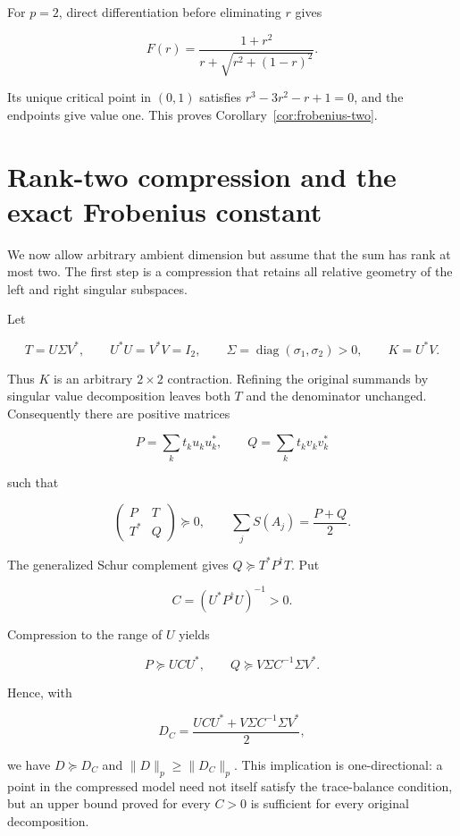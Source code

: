 \documentclass[11pt]{article}
\begin{document}
For $p=2$, direct differentiation before eliminating $r$ gives

\[
F(r)=\frac{1+r^2}{r+\sqrt{r^2+(1-r)^2}}.
\]

Its unique critical point in $(0,1)$ satisfies
$r^3-3r^2-r+1=0$, and the endpoints give value one. This proves Corollary~\ref{cor:frobenius-two}.

\section{Rank-two compression and the exact Frobenius constant}


We now allow arbitrary ambient dimension but assume that the sum has rank at most
two. The first step is a compression that retains all relative geometry of the
left and right singular subspaces.

Let

\[
T=U\Sigma V^*,\qquad U^*U=V^*V=I_2,\qquad
\Sigma=\operatorname{diag}(\sigma_1,\sigma_2)>0,
\qquad K=U^*V.
\tag{6.1}\label{eq:6.1}
\]

Thus $K$ is an arbitrary $2\times2$ contraction. Refining the original summands
by singular value decomposition leaves both $T$ and the denominator unchanged.
Consequently there are positive matrices

\[
P=\sum_k t_ku_ku_k^*,\qquad
Q=\sum_k t_kv_kv_k^*
\tag{6.2}\label{eq:6.2}
\]

such that

\[
\begin{pmatrix}P&T\\T^*&Q\end{pmatrix}\succeq0,\qquad
\sum_jS(A_j)=\frac{P+Q}{2}.
\tag{6.3}\label{eq:6.3}
\]

The generalized Schur complement gives
$Q\succeq T^*P^\dagger T$. Put

\[
C=(U^*P^\dagger U)^{-1}>0.
\tag{6.4}\label{eq:6.4}
\]

Compression to the range of $U$ yields

\[
P\succeq UCU^*,\qquad
Q\succeq V\Sigma C^{-1}\Sigma V^*.
\tag{6.5}\label{eq:6.5}
\]

Hence, with

\[
D_C=\frac{UCU^*+V\Sigma C^{-1}\Sigma V^*}{2},
\tag{6.6}\label{eq:6.6}
\]

we have $D\succeq D_C$ and $\|D\|_p\ge\|D_C\|_p$. This implication is
one-directional: a point in the compressed model need not itself satisfy the
trace-balance condition, but an upper bound proved for every $C>0$ is sufficient
for every original decomposition.
\end{document}
